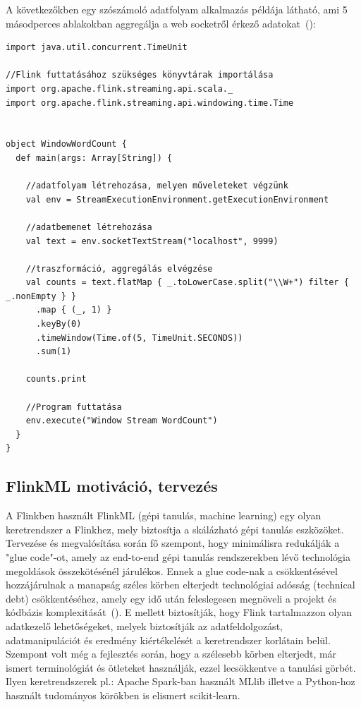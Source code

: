 \documentclass[a4paper,12pt]{article}
\begin{document}
A következőkben egy szószámoló adatfolyam alkalmazás példája látható, ami 5 másodperces ablakokban aggregálja a web socketről érkező adatokat~(\cite{flink_wordcount}):
\newpage
\begin{lstlisting}[style=Scala]
import java.util.concurrent.TimeUnit

//Flink futtatásához szükséges könyvtárak importálása
import org.apache.flink.streaming.api.scala._
import org.apache.flink.streaming.api.windowing.time.Time


object WindowWordCount {
  def main(args: Array[String]) {

    //adatfolyam létrehozása, melyen műveleteket végzünk
    val env = StreamExecutionEnvironment.getExecutionEnvironment
    
    //adatbemenet létrehozása
    val text = env.socketTextStream("localhost", 9999)

	//traszformáció, aggregálás elvégzése
    val counts = text.flatMap { _.toLowerCase.split("\\W+") filter { _.nonEmpty } }
      .map { (_, 1) }
      .keyBy(0)
      .timeWindow(Time.of(5, TimeUnit.SECONDS))
      .sum(1)

    counts.print

	//Program futtatása
    env.execute("Window Stream WordCount")
  }
}
\end{lstlisting}


\subsection{FlinkML motiváció, tervezés}

A Flinkben használt FlinkML (gépi tanulás, machine learning) egy olyan keretrendszer a Flinkhez, mely biztosítja a skálázható gépi tanulás eszközöket. Tervezése és megvalósítása során fő szempont, hogy minimálisra redukálják a "glue code"-ot, amely az end-to-end gépi tanulás rendszerekben lévő technológia megoldások összekötésénél járulékos. Ennek a glue code-nak a csökkentésével hozzájárulnak a manapság széles körben elterjedt technológiai adósság (technical debt) csökkentéséhez, amely egy idő után feleslegesen megnöveli a projekt és kódbázis komplexitását~(\cite{mldebt}). E mellett biztosítják, hogy Flink tartalmazzon olyan adatkezelő lehetőségeket, melyek biztosítják az adatfeldolgozást, adatmanipulációt és eredmény kiértékelését a keretrendszer korlátain belül. Szempont volt még a fejlesztés során, hogy a szélesebb körben elterjedt, már ismert terminológiát és ötleteket használják, ezzel lecsökkentve a tanulási görbét. Ilyen keretrendszerek pl.: Apache Spark-ban használt MLlib illetve a Python-hoz használt tudományos körökben is elismert scikit-learn. \newline
\end{document}
